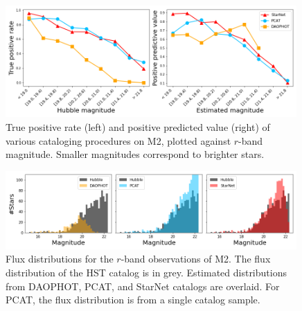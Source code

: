 



\begin{figure}[tb]
    \centering
    \includegraphics[width=0.99\textwidth]{figures/m2_results/summary_statistics_m2.png}
    \vspace{-0.4cm}
    \caption{True positive rate (left) and positive predicted value (right) of various cataloging
    procedures on M2, plotted against $r$-band magnitude.
    Smaller magnitudes correspond to brighter stars.
    }
    \label{fig:summary_stats}
\end{figure}


\begin{figure}[tb]
    \centering
    \includegraphics[width=0.99\textwidth]{figures/m2_results/luminosity_fun.png}
    \vspace{-0.4cm}
    \caption{Flux distributions for the $r$-band observations of M2.
    The flux distribution of the HST catalog is in grey.
    Estimated distributions from DAOPHOT, PCAT, and StarNet catalogs are overlaid.
    For PCAT, the flux distribution is from a single catalog sample. }
    \label{fig:luminosity_fun_m2}
\end{figure}


